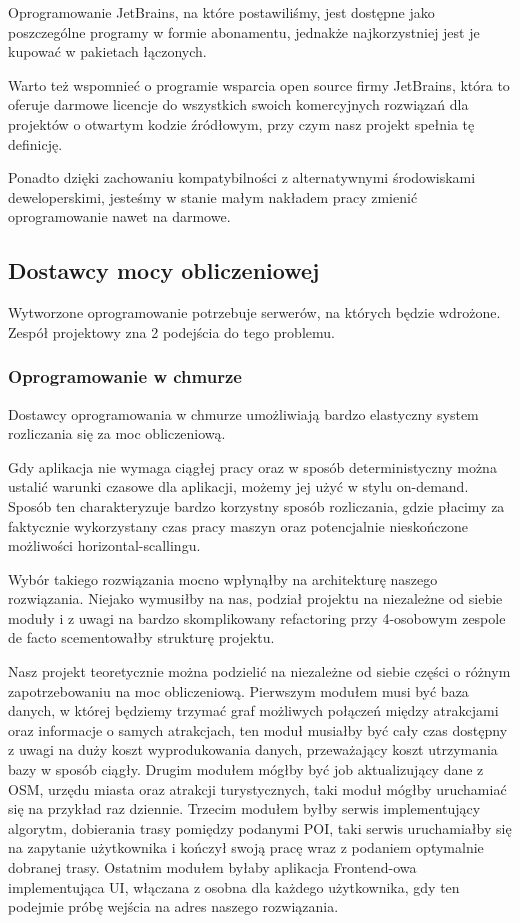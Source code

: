 Oprogramowanie JetBrains, na które postawiliśmy, jest dostępne jako poszczególne programy w formie abonamentu, jednakże najkorzystniej jest je kupować w pakietach łączonych.

Warto też wspomnieć o programie wsparcia open source firmy JetBrains, która to oferuje darmowe licencje do wszystkich swoich komercyjnych rozwiązań dla projektów o otwartym kodzie źródłowym, przy czym nasz projekt spełnia tę definicję.

Ponadto dzięki zachowaniu kompatybilności z alternatywnymi środowiskami deweloperskimi, jesteśmy w stanie małym nakładem pracy zmienić oprogramowanie nawet na darmowe.

\subsection{Dostawcy mocy obliczeniowej}
\label{subsec:dostawcy-mocy-obliczeniowej}
Wytworzone oprogramowanie potrzebuje serwerów, na których będzie wdrożone.
Zespół projektowy zna 2 podejścia do tego problemu.

\subsubsection{Oprogramowanie w chmurze}
Dostawcy oprogramowania w chmurze umożliwiają bardzo elastyczny system rozliczania się za moc obliczeniową.

Gdy aplikacja nie wymaga ciągłej pracy oraz w sposób deterministyczny można ustalić warunki czasowe dla aplikacji, możemy jej użyć w stylu on-demand.
Sposób ten charakteryzuje bardzo korzystny sposób rozliczania, gdzie płacimy za faktycznie wykorzystany czas pracy maszyn oraz potencjalnie nieskończone możliwości horizontal-scallingu.

Wybór takiego rozwiązania mocno wpłynąłby na architekturę naszego rozwiązania.
Niejako wymusiłby na nas, podział projektu na niezależne od siebie moduły i z uwagi na bardzo skomplikowany refactoring przy 4-osobowym zespole de facto scementowałby strukturę projektu.

Nasz projekt teoretycznie można podzielić na niezależne od siebie części o różnym zapotrzebowaniu na moc obliczeniową.
Pierwszym modułem musi być baza danych, w której będziemy trzymać graf możliwych połączeń między atrakcjami oraz informacje o samych atrakcjach, ten moduł musiałby być cały czas dostępny z uwagi na duży koszt wyprodukowania danych, przeważający koszt utrzymania bazy w sposób ciągły.
Drugim modułem mógłby być job aktualizujący dane z OSM, urzędu miasta oraz atrakcji turystycznych, taki moduł mógłby uruchamiać się na przykład raz dziennie.
Trzecim modułem byłby serwis implementujący algorytm, dobierania trasy pomiędzy podanymi POI, taki serwis uruchamiałby się na zapytanie użytkownika i kończył swoją pracę wraz z podaniem optymalnie dobranej trasy.
Ostatnim modułem byłaby aplikacja Frontend-owa implementująca UI, włączana z osobna dla każdego użytkownika, gdy ten podejmie próbę wejścia na adres naszego rozwiązania.

